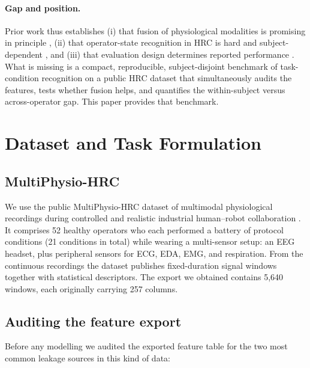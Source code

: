 \documentclass{llncs}
\begin{document}
\paragraph{Gap and position.}
Prior work thus establishes (i) that fusion of physiological modalities is promising
in principle \cite{baltrusaitis2019multimodal}, (ii) that operator-state recognition
in \ac{HRC} is hard and subject-dependent
\cite{bussolan2025multiphysiohrc,bussolan2024stressdetector,borghi2025operatorstress,aygun2022assistive},
and (iii)
that evaluation design determines reported performance
\cite{jin2025cognitivestate,iarlori2024cognitiveworkload}. What is missing is a
compact, reproducible,
subject-disjoint benchmark of task-condition recognition on a public \ac{HRC} dataset
that simultaneously audits the features, tests whether fusion helps, and quantifies
the within-subject versus across-operator gap. This paper provides that benchmark.

\section{Dataset and Task Formulation}
\label{sec:dataset}

\subsection{MultiPhysio-\ac{HRC}}

We use the public MultiPhysio-\ac{HRC} dataset of multimodal physiological recordings
during controlled and realistic industrial human--robot collaboration
\cite{bussolan2025multiphysiohrc}. It comprises 52 healthy operators who each
performed a battery of protocol conditions (21 conditions in total) while wearing a
multi-sensor setup: an \ac{EEG} headset, plus peripheral sensors for \ac{ECG},
\ac{EDA}, \ac{EMG}, and respiration. From the continuous recordings the dataset
publishes fixed-duration signal windows together with statistical descriptors. The
export we obtained contains 5,640 windows, each originally carrying 257 columns.

\subsection{Auditing the feature export}

Before any modelling we audited the exported feature table for the two most common
leakage sources in this kind of data:
\end{document}
